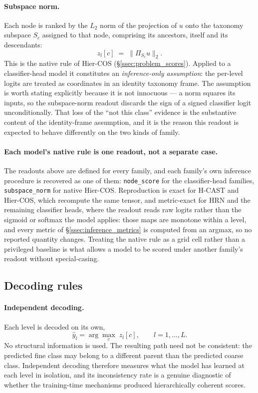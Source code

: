 \paragraph{Subspace norm.} Each node is ranked by the $L_2$ norm of the projection
of $u$ onto the taxonomy subspace $S_c$ assigned to that node, comprising its
ancestors, itself and its descendants:
\[
z_l[c] \;=\; \big\lVert \Pi_{S_c} u \big\rVert_2 .
\]
This is the native rule of Hier-COS (\S\ref{ssec:problem_scores}). Applied to a
classifier-head model it constitutes an \emph{inference-only assumption}: the
per-level logits are treated as coordinates in an identity taxonomy frame. The
assumption is worth stating explicitly because it is not innocuous --- a norm
squares its inputs, so the subspace-norm readout discards the sign of a signed
classifier logit unconditionally. That loss of the ``not this class'' evidence is
the substantive content of the identity-frame assumption, and it is the reason
this readout is expected to behave differently on the two kinds of family.

\paragraph{Each model's native rule is one readout, not a separate case.} The
readouts above are defined for every family, and each family's own inference
procedure is recovered as one of them: \texttt{node\_score} for the
classifier-head families, \texttt{subspace\_norm} for native Hier-COS.
Reproduction is exact for H-CAST and Hier-COS, which recompute the same tensor,
and metric-exact for HRN and the remaining classifier heads, where the readout
reads raw logits rather than the sigmoid or softmax the model applies: those maps
are monotone within a level, and every metric of \S\ref{ssec:inference_metrics} is
computed from an argmax, so no reported quantity changes. Treating the native rule
as a grid cell rather than a privileged baseline is what allows a model to be
scored under another family's readout without special-casing.

\subsection{Decoding rules}
\label{ssec:inference_decoding}

\paragraph{Independent decoding.} Each level is decoded on its own,
\[
\hat y_l=\arg\max_{c}\; z_l[c],\qquad l=1,\dots,L .
\]
No structural information is used. The resulting path need not be consistent: the
predicted fine class may belong to a different parent than the predicted coarse
class. Independent decoding therefore measures what the model has learned at each
level in isolation, and its inconsistency rate is a genuine diagnostic of whether
the training-time mechanisms produced hierarchically coherent scores.

